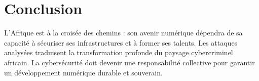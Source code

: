 \documentclass[12pt,a4paper]{article}
\begin{document}
\section{Conclusion}
L’Afrique est à la croisée des chemins : son avenir numérique dépendra de sa capacité à sécuriser ses infrastructures et à former ses talents. Les attaques analysées traduisent la transformation profonde du paysage cybercriminel africain. La cybersécurité doit devenir une responsabilité collective pour garantir un développement numérique durable et souverain.
\end{document}
